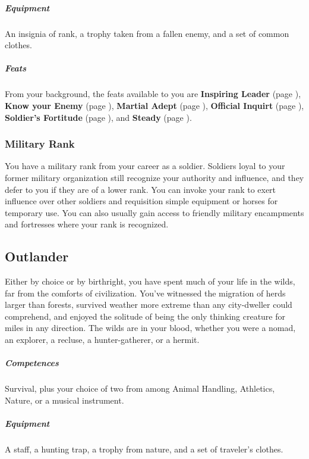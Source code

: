     \subparagraph{Equipment} An insignia of rank, a trophy taken from a fallen enemy, and a set of common clothes.

    \subparagraph{Feats} From your background, the feats available to you are
    \textbf{Inspiring Leader} (page \pageref{feat::inspiringleader}),
    \textbf{Know your Enemy} (page \pageref{feat::knowyourenemy}),
    \textbf{Martial Adept} (page \pageref{feat::martialadept}),
    \textbf{Official Inquirt} (page \pageref{feat::officialinquiry}),
    \textbf{Soldier's Fortitude} (page \pageref{feat::soldiersfortitude}), and
    \textbf{Steady} (page \pageref{feat::steady}).

    \subsubsection{Military Rank}
        You have a military rank from your career as a soldier.
        Soldiers loyal to your former military organization still recognize your authority and influence, and they defer to you if they are of a lower rank.
        You can invoke your rank to exert influence over other soldiers and requisition simple equipment or horses for temporary use.
        You can also usually gain access to friendly military encampments and fortresses where your rank is recognized.

\subsection*{Outlander} \label{ssec::outlander}
    Either by choice or by birthright, you have spent much of your life in the wilds, far from the comforts of civilization.
    You've witnessed the migration of herds larger than forests, survived weather more extreme than any city-dweller could comprehend, and enjoyed the solitude of being the only thinking creature for miles in any direction.
    The wilds are in your blood, whether you were a nomad, an explorer, a recluse, a hunter-gatherer, or a hermit.

    \subparagraph{Competences} Survival, plus your choice of two from among Animal Handling, Athletics, Nature, or a musical instrument.

    \subparagraph{Equipment} A staff, a hunting trap, a trophy from nature, and a set of traveler's clothes.

